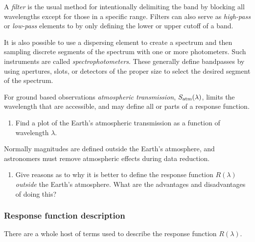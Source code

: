 \documentclass{article}
\begin{document}
A {\it filter} is the usual method for intentionally delimiting the
band by blocking all wavelengths except for those in a specific
range. Filters can also serve as {\it high-pass} or {\it low-pass}
elements to by only defining the lower or upper cutoff of a band.

It is also possible to use a dispersing element to create a spectrum
and then sampling discrete segments of the spectrum with one or more
photometers. Such instruments are called {\it
  spectrophotometers}. These generally define bandpasses by using
apertures, slots, or detectors of the proper size to select the
desired segment of the spectrum. 

For ground based observations {\it atmospheric transmission}, $S_{\rm
  atm}(\lambda)$, limits the wavelength that are accessible, and may
define all or parts of a response function. 

\begin{enumerate}
\setcounter{enumi}{\value{count}}
\item Find a plot of the Earth's atmospheric transmission as a
  function of wavelength $\lambda$.
\setcounter{count}{\value{enumi}} 
\end{enumerate}

Normally magnitudes are defined outside the Earth's atmosphere, and
astronomers must remove atmospheric effects during data reduction.

\begin{enumerate}
\setcounter{enumi}{\value{count}}
\item Give reasons as to why it is better to define the response
  function $R(\lambda)$ {\it outside} the Earth's atmosphere. What are
  the advantages and disadvantages of doing this?
\setcounter{count}{\value{enumi}} 
\end{enumerate}

\subsubsection{Response function description}

There are a whole host of terms used to describe the response
function $R(\lambda)$. 
\end{document}
